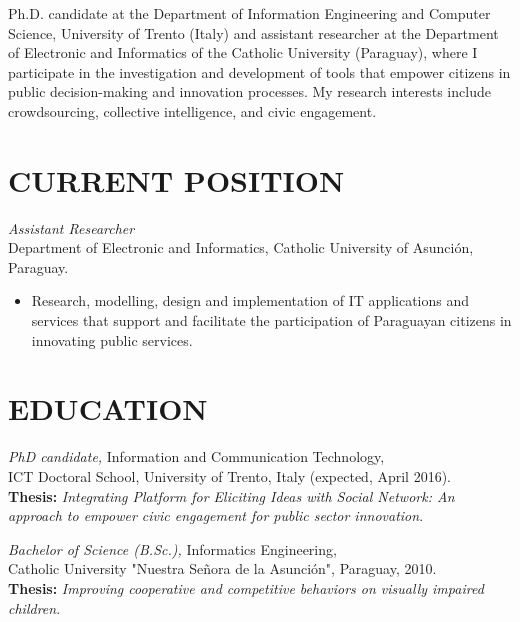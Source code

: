 \documentclass[line,margin]{res}
\begin{document}

\address{jorgesaldivar@gmail.com}
\address{\url{www.jorgesaldivargalli.com}}

\begin{resume}
 
\small{Ph.D. candidate at the Department of Information Engineering and Computer Science, University of Trento (Italy) and assistant researcher at the Department of Electronic and Informatics of the Catholic University (Paraguay), where I participate in the investigation and development of tools that empower citizens in public decision-making and innovation processes. My research interests include crowdsourcing, collective intelligence, and civic engagement}.

\section{CURRENT POSITION}
{\sl Assistant Researcher} \hfill \\
Department of Electronic and Informatics, Catholic University of Asunci\'on, Paraguay.
\begin{itemize}  \itemsep -2pt %
\item Research, modelling, design and implementation of IT applications and services that support and facilitate the participation of Paraguayan citizens in innovating public services.
\end{itemize}
 
\section{EDUCATION} 
	{\sl PhD candidate,} Information and Communication Technology,\\ 
ICT Doctoral School, University of Trento, Italy (expected, April 2016).\\
	{\bf Thesis:} \emph{Integrating Platform for Eliciting Ideas with Social Network: An approach to empower civic engagement for public sector innovation}.
                
	{\sl Bachelor of Science (B.Sc.),} Informatics Engineering,\\ 
    Catholic University "Nuestra Se\~nora de la Asunci\'on", Paraguay, 2010.\\
    {\bf Thesis:} \emph{Improving cooperative and competitive behaviors on visually impaired children}.
 

\end{resume}
\end{document}
